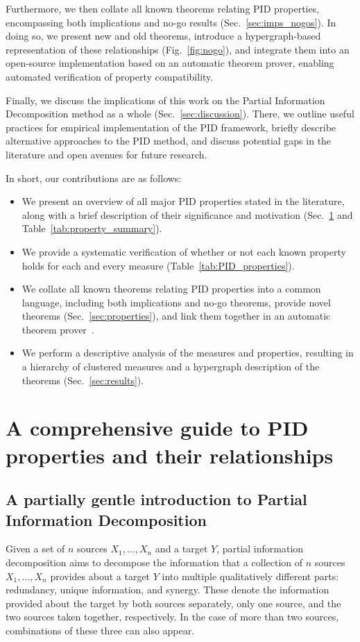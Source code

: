\documentclass{article}
\newcommand{\Xs}{X_1,\ldots,X_n}
\begin{document}
Furthermore, we then collate all known theorems relating PID properties, encompassing both implications and no-go results (Sec.~\ref{sec:imps_nogos}). In doing so, we present new and old theorems, introduce a hypergraph-based representation of these relationships (Fig.~\ref{fig:nogo}), and integrate them into an open-source implementation based on an automatic theorem prover, enabling automated verification of property compatibility.

Finally, we discuss the implications of this work on the Partial Information Decomposition method as a whole (Sec.~\ref{sec:discussion}). There, we outline useful practices for empirical implementation of the PID framework, briefly describe alternative approaches to the PID method, and discuss potential gaps in the literature and open avenues for future research.

In short, our contributions are as follows:
\begin{itemize}
    \item We present an overview of all major PID properties stated in the literature, along with a brief description of their significance and motivation (Sec.~\ref{sec:guide} and Table~\ref{tab:property_summary}).
    \item We provide a systematic verification of whether or not each known property holds for each and every measure (Table~\ref{tab:PID_properties}).
    \item We collate all known theorems relating PID properties into a common language, including both implications and no-go theorems, provide novel theorems (Sec.~\ref{sec:properties}), and link them together in an automatic theorem prover~\cite{de2008z3}.
    \item We perform a descriptive analysis of the measures and properties, resulting in a hierarchy of clustered measures and a hypergraph description of the theorems (Sec.~\ref{sec:results}).
\end{itemize}

\section{A comprehensive guide to PID properties and their relationships} \label{sec:guide}

\subsection{A partially gentle introduction to Partial Information Decomposition}
Given a set of $n$ sources $\Xs$ and a target $Y$, partial information decomposition aims to decompose the information that a collection of $n$ sources $\Xs$ provides about a target $Y$ into multiple qualitatively different parts: redundancy, unique information, and synergy. These denote the information provided about the target by both sources separately, only one source, and the two sources taken together, respectively. In the case of more than two sources, combinations of these three can also appear.
\end{document}
